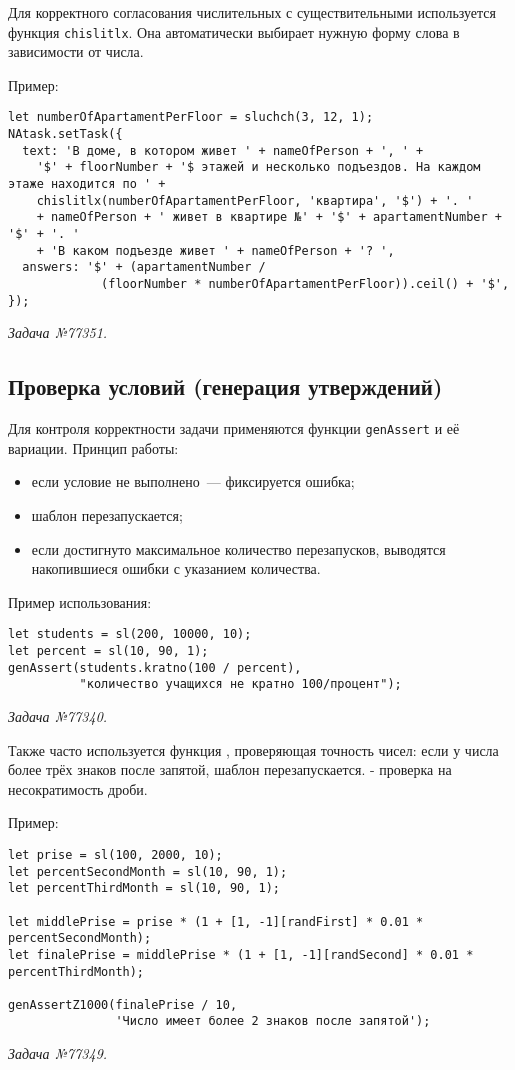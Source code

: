 Для корректного согласования числительных с существительными используется функция \texttt{chislitlx}. Она автоматически выбирает нужную форму слова в зависимости от числа.  

Пример:
\begin{lstlisting}
let numberOfApartamentPerFloor = sluchch(3, 12, 1);
NAtask.setTask({
  text: 'В доме, в котором живет ' + nameOfPerson + ', ' +
    '$' + floorNumber + '$ этажей и несколько подъездов. На каждом этаже находится по ' +
    chislitlx(numberOfApartamentPerFloor, 'квартира', '$') + '. '
    + nameOfPerson + ' живет в квартире №' + '$' + apartamentNumber + '$' + '. '
    + 'В каком подъезде живет ' + nameOfPerson + '? ',
  answers: '$' + (apartamentNumber /
             (floorNumber * numberOfApartamentPerFloor)).ceil() + '$',
});
\end{lstlisting}
\textsl{Задача №77351.}

\subsection{Проверка условий (генерация утверждений)}
Для контроля корректности задачи применяются функции \texttt{genAssert} и её вариации. Принцип работы:  
\begin{itemize}
    \item если условие не выполнено~--- фиксируется ошибка;
    \item шаблон перезапускается;
    \item если достигнуто максимальное количество перезапусков, выводятся накопившиеся ошибки с указанием количества.
\end{itemize}

Пример использования:
\begin{lstlisting}
let students = sl(200, 10000, 10);
let percent = sl(10, 90, 1); 
genAssert(students.kratno(100 / percent),
          "количество учащихся не кратно 100/процент");
\end{lstlisting}
\textsl{Задача №77340.}

Также часто используется функция , проверяющая точность чисел: если у числа более трёх знаков после запятой, шаблон перезапускается.  
 - проверка на несократимость дроби.

Пример:
\begin{lstlisting}
let prise = sl(100, 2000, 10);
let percentSecondMonth = sl(10, 90, 1);
let percentThirdMonth = sl(10, 90, 1);

let middlePrise = prise * (1 + [1, -1][randFirst] * 0.01 * percentSecondMonth);
let finalePrise = middlePrise * (1 + [1, -1][randSecond] * 0.01 * percentThirdMonth);

genAssertZ1000(finalePrise / 10,
               'Число имеет более 2 знаков после запятой');
\end{lstlisting}
\textsl{Задача №77349.}

